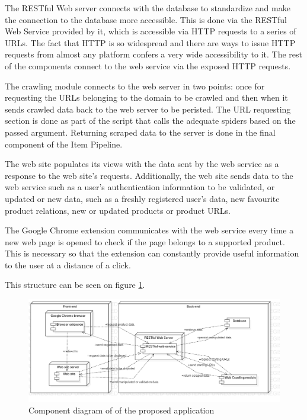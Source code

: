 \documentclass[12pt,a4paper,twoside]{report}
\begin{document}
The RESTful Web server connects with the database to standardize and make the connection to the database more accessible. This is done via the RESTful Web Service provided by it, which is accessible via HTTP requests to a series of URLs. The fact that HTTP is so widespread and there are ways to issue HTTP requests from almost any platform confers a very wide accessibility to it. The rest of the components connect to the web service via the exposed HTTP requests.

The crawling module connects to the web server in two points: once for requesting the URLs belonging to the domain to be crawled and then when it sends crawled data back to the web server to be peristed. The URL requesting section is done as part of the script that calls the adequate spiders based on the passed argument. Returning scraped data to the server is done in the final component of the Item Pipeline.

The web site populates its views with the data sent by the web service as a response to the web site's requests. Additionally, the web site sends data to the web service such as a user's authentication information to be validated, or updated or new data, such as a freshly registered user's data, new favourite product relations, new or updated products or product URLs.

The Google Chrome extension communicates with the web service every time a new web page is opened to check if the page belongs to a supported product. This is necessary so that the extension can constantly provide useful information to the user at a distance of a click.

This structure can be seen on figure \ref{fig:app_component_diagram}.

\begin{figure}[ht]
  \centering
  \includegraphics[width=\linewidth]{img/app_component_diagram_actual.png}
  \caption[]{Component diagram of of the proposed application}
  \label{fig:app_component_diagram}
\end{figure}
\end{document}
